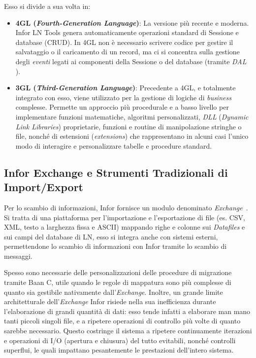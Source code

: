 Esso si divide a sua volta in:
\begin{itemize}
    \item \textbf{4GL (\textit{Fourth-Generation Language})}: La versione più recente e moderna.
    Infor LN Tools genera automaticamente operazioni standard di Sessione e database (CRUD). In 4GL non è necessario
    scrivere codice per gestire il salvataggio o il caricamento di un record, ma ci si concentra sulla gestione
    degli \textit{eventi} legati ai componenti della Sessione o del database (tramite \textit{DAL} \cite{inforDal2Guide}).
    \item \textbf{3GL (\textit{Third-Generation Language})}: Precedente a 4GL, e totalmente integrato con esso, viene utilizzato
    per la gestione di logiche di \textit{business} complesse.
    Permette un approccio più procedurale e a basso livello per implementare funzioni matematiche, algoritmi personalizzati,
    \textit{DLL} (\textit{Dynamic Link Libraries}) proprietarie, funzioni e routine di manipolazione stringhe o file, nonché di estensioni (\textit{extensions})
    che rappresentano in alcuni casi l'unico modo di interagire e personalizzare tabelle e procedure standard.
\end{itemize}

\subsection{Infor Exchange e Strumenti Tradizionali di Import/Export}\label{subsec:infor-exchange-e-strumenti-di-import/export}
Per lo scambio di informazioni, Infor fornisce un modulo denominato \textit{Exchange}~\cite{inforExchangeGuide}.
Si tratta di una piattaforma per l'importazione e l'esportazione di file (es.
CSV, XML, testo a larghezza fissa e ASCII) mappando righe e colonne sui \textit{Datafiles} e sui campi del database di LN,
esso si integra anche con sistemi esterni, permettendone lo scambio di informazioni con Infor tramite lo scambio di messaggi.

Spesso sono necessarie delle personalizzazioni delle procedure di migrazione tramite Baan C, utile quando le regole di
mappatura sono più complesse di quanto sia gestibile nativamente dall'\textit{Exchange}.
Inoltre, un grande limite architetturale dell'\textit{Exchange} Infor risiede nella sua inefficienza durante l'elaborazione
di grandi quantità di dati: esso tende infatti a elaborare man mano tanti piccoli singoli file, e a ripetere operazioni di controllo più volte di quanto sarebbe necessario.
Questo costringe il sistema a ripetere continuamente iterazioni e operazioni di I/O (apertura e chiusura) del tutto evitabili,
nonché controlli superflui, le quali impattano pesantemente le prestazioni dell'intero sistema.

